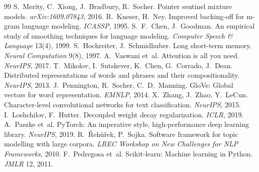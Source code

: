 \documentclass[10pt,a4paper]{article}
\begin{document}
\small
\begin{thebibliography}{99}
 S.~Merity, C.~Xiong, J.~Bradbury, R.~Socher. Pointer sentinel mixture models. \emph{arXiv:1609.07843}, 2016.
 R.~Kneser, H.~Ney. Improved backing-off for m-gram language modeling. \emph{ICASSP}, 1995.
 S.~F.~Chen, J.~Goodman. An empirical study of smoothing techniques for language modeling. \emph{Computer Speech \& Language} 13(4), 1999.
 S.~Hochreiter, J.~Schmidhuber. Long short-term memory. \emph{Neural Computation} 9(8), 1997.
 A.~Vaswani et~al. Attention is all you need. \emph{NeurIPS}, 2017.
 T.~Mikolov, I.~Sutskever, K.~Chen, G.~Corrado, J.~Dean. Distributed representations of words and phrases and their compositionality. \emph{NeurIPS}, 2013.
 J.~Pennington, R.~Socher, C.~D.~Manning. GloVe: Global vectors for word representation. \emph{EMNLP}, 2014.
 X.~Zhang, J.~Zhao, Y.~LeCun. Character-level convolutional networks for text classification. \emph{NeurIPS}, 2015.
 I.~Loshchilov, F.~Hutter. Decoupled weight decay regularization. \emph{ICLR}, 2019.
 A.~Paszke et~al. PyTorch: An imperative style, high-performance deep learning library. \emph{NeurIPS}, 2019.
 R.~\v{R}eh\r{u}\v{r}ek, P.~Sojka. Software framework for topic modelling with large corpora. \emph{LREC Workshop on New Challenges for NLP Frameworks}, 2010.
 F.~Pedregosa et~al. Scikit-learn: Machine learning in Python. \emph{JMLR} 12, 2011.
\end{thebibliography}
\normalsize

\appendix
\end{document}

